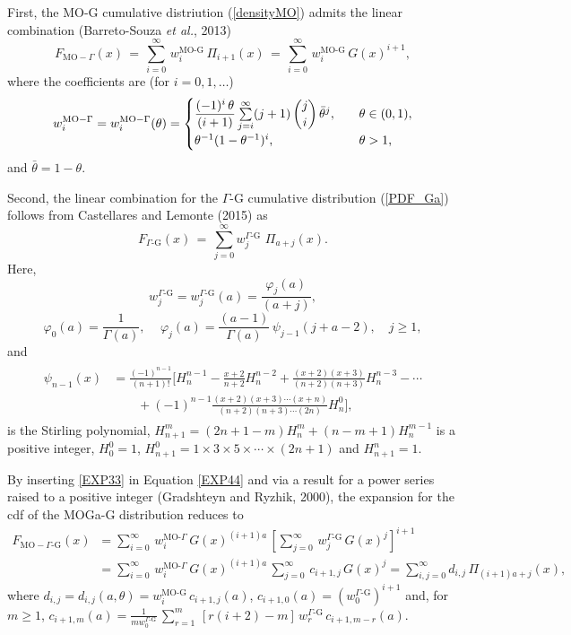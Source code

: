 \documentclass[twoside,leqno,11pt]{article}
\begin{document}
First, the MO-G cumulative distriution (\ref{densityMO}) admits the
linear combination (Barreto-Souza \emph{et al.}, 2013)
\begin{equation}
F_{\text{MO}-\Gamma}(x)
\,=\,
\sum^{\infty}_{i=0}\,w_i^{\text{MO-G}}\,\Pi_{i+1}(x)\,=\,\sum^{\infty}_{i=0}\,w_i^{\text{MO-G}}\,G(x)^{i+1},
\label{EXP44}
\end{equation}
where the coefficients are (for $i=0,1,\ldots$)
\[
w_i^{\text{MO}-\Gamma}=w_i^{\text{MO}-\Gamma}(\theta) =
\begin{cases}
\dfrac{(-1)^i\,\theta}{(i+1)} \sum\limits^{\infty}_{j=i}(j+1)\,\dbinom{j}{i}\,\bar{\theta}^j,& \quad \theta\in (0,1),\\
\theta^{-1} (1-\theta^{-1})^i,& \quad \theta>1,
\end{cases}
\]
and $\bar{\theta}=1-\theta$.


Second, the linear combination for the $\Gamma\text{-G}$ cumulative distribution (\ref{PDF_Ga}) follows from Castellares and Lemonte (2015) as
\begin{equation}\label{EXP33}
F_{\Gamma\text{-G}}(x)\,=\,\sum_{j=0}^\infty w_{j}^{\Gamma\text{-G}}\,\,\Pi_{a+j}(x).
\end{equation}
Here,
$$w_j^{\Gamma\text{-G}}=w_j^{\Gamma\text{-G}}(a)=\frac{\varphi_{j}(a)}{(a+j)},$$
\begin{equation*}\label{coeficientes}
\varphi_0(a)=\frac{1}{\Gamma(a)},
\quad\,
\varphi_j(a)=\frac{(a-1)}{\Gamma(a)}\,\psi_{j-1}(j+a-2),\quad j\geq 1,
\end{equation*}
and
\begin{align*}\label{polinomios_ward}
\begin{split}
\psi_{n-1}(x)&=\frac{(-1)^{n-1}}{(n+1)!}\Biggl[H^{n-1}_{n}-\frac{x+2}{n+2}H^{n-2}_{n}
+ \frac{(x+2)(x+3)}{(n+2)(n+3)}H^{n-3}_{n}- \cdots\\
&\qquad+ (-1)^{n-1}\frac{(x+2)(x+3)\cdots(x+n)}{(n+2)(n+3)\cdots(2n)}H^{0}_{n}\Biggr],
\end{split}
\end{align*}
is the Stirling polynomial, $H^{m}_{n+1}=(2n+1-m)H^{m}_{n} + (n-m+1)H^{m-1}_{n}$ is a positive integer,
$H^0_0=1$, $H^{0}_{n+1}=1\times 3\times 5\times\cdots\times(2n+1)$ and $H^{n}_{n+1}=1$.

By inserting \eqref{EXP33} in Equation \eqref{EXP44} and via a result for a power series raised to a positive integer (Gradshteyn and
Ryzhik, 2000), the expansion for the cdf of the MOGa-G distribution reduces to
\begin{align*}
F_{\text{MO}-\Gamma\text{-G}}(x)&=\sum_{i=0}^{\infty}\,w_{i}^{\text{MO-}\Gamma}\,G(x)^{(i+1)a}\,\left[\sum_{j=0}^{\infty}\,w_{j}^{\Gamma\text{-G}}\,G(x)^{j}\right]^{i+1}\\
&=\sum_{i=0}^{\infty}\,w_{i}^{\text{MO-}\Gamma}\,G(x)^{(i+1)a}\,\sum_{j=0}^{\infty}\,c_{i+1,j}\,G(x)^{j} =\sum_{i,j=0}^\infty d_{i,j}\,\Pi_{(i+1)a+j}(x),
\end{align*}
where $d_{i,j}=d_{i,j}(a,\theta)=w_{i}^{\text{MO-G}}\,c_{i+1,j}(a)$, $c_{i+1,0}(a)=(w_{0}^{\Gamma\text{-G}})^{i+1}$ and, for $m \ge 1$,
$c_{i+1,m}(a)=\frac{1}{m w_{0}^{\Gamma\text{-G}}}\,\sum^{m}_{r=1}\,\left[r(i+2)-m\right]\,w_{r}^{\Gamma\text{-G}}\,c_{i+1,m-r}(a)$.
\end{document}
